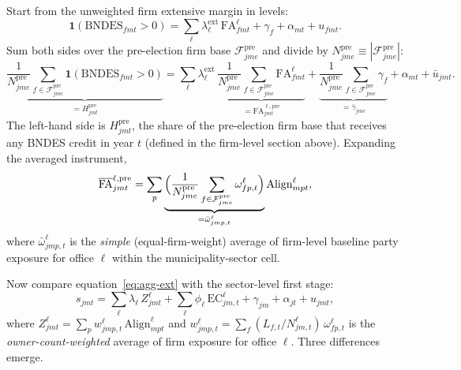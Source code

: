 \documentclass{article}
\newcommand{\Align}{\mathrm{Align}}
\newcommand{\FA}{\mathrm{FA}}
\newcommand{\EC}{\mathrm{EC}}
\begin{document}
Start from the unweighted firm extensive margin in levels:
\[
  \mathbf{1}(\text{BNDES}_{fmt} > 0)
  = \sum_{\ell} \lambda^{\text{ext}}_{\ell}\, \FA^{\ell}_{fmt}
  + \gamma_{f} + \alpha_{mt} + u_{fmt}.
\]
Sum both sides over the pre-election firm base
$\mathcal{F}^{\mathrm{pre}}_{jme}$ and divide by
$N^{\mathrm{pre}}_{jme} \equiv |\mathcal{F}^{\mathrm{pre}}_{jme}|$:
\begin{equation}\label{eq:agg-ext}
  \underbrace{
    \frac{1}{N^{\mathrm{pre}}_{jme}}
    \sum_{f \in \mathcal{F}^{\mathrm{pre}}_{jme}}
    \mathbf{1}(\text{BNDES}_{fmt} > 0)
  }_{= H^{\mathrm{pre}}_{jmt}}
  =
  \sum_{\ell} \lambda^{\text{ext}}_{\ell}\,
  \underbrace{
    \frac{1}{N^{\mathrm{pre}}_{jme}}
    \sum_{f \in \mathcal{F}^{\mathrm{pre}}_{jme}}
    \FA^{\ell}_{fmt}
  }_{= \overline{\FA}^{\ell,\mathrm{pre}}_{jmt}}
  +
  \underbrace{
    \frac{1}{N^{\mathrm{pre}}_{jme}}
    \sum_{f \in \mathcal{F}^{\mathrm{pre}}_{jme}}
    \gamma_f
  }_{= \bar{\gamma}_{jme}}
  + \alpha_{mt}
  + \bar{u}_{jmt}.
\end{equation}
The left-hand side is $H^{\mathrm{pre}}_{jmt}$, the share of the pre-election
firm base that receives any BNDES credit in year $t$ (defined in the
firm-level section above).
Expanding the averaged instrument,
\[
  \overline{\FA}^{\ell,\mathrm{pre}}_{jmt}
  = \sum_p
  \underbrace{
    \Bigl(\frac{1}{N^{\mathrm{pre}}_{jme}}
    \sum_{f \in \mathcal{F}^{\mathrm{pre}}_{jme}} \omega^\ell_{fp,t}\Bigr)
  }_{= \bar{\omega}^\ell_{jmp,t}}
  \Align^{\ell}_{mpt},
\]
where $\bar{\omega}^\ell_{jmp,t}$ is the \emph{simple} (equal-firm-weight)
average of firm-level baseline party exposure for office $\ell$ within the municipality-sector
cell.

Now compare equation~\eqref{eq:agg-ext} with the sector-level first stage:
\[
  s_{jmt}
  = \sum_{\ell} \lambda_{\ell}\, Z^{\ell}_{jmt}
  + \sum_{\ell} \phi_\ell\,\EC^\ell_{jm,t} + \gamma_{jm} + \alpha_{jt} + u_{jmt},
\]
where $Z^{\ell}_{jmt} = \sum_p w^\ell_{jmp,t}\,\Align^{\ell}_{mpt}$
and $w^\ell_{jmp,t} = \sum_f (L_{f,t}/N^\ell_{jm,t})\,\omega^\ell_{fp,t}$
is the \emph{owner-count-weighted} average of firm exposure for office $\ell$.
Three differences emerge.
\end{document}
